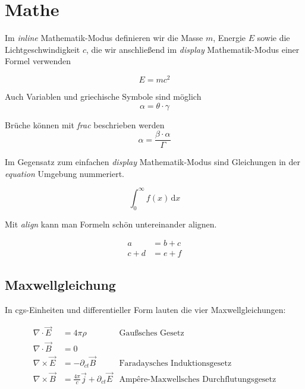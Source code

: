 \section{Mathe}

Im \textit{inline} Mathematik-Modus definieren wir die Masse $m$, Energie $E$ sowie die Lichtgeschwindigkeit \(c\), die wir anschließend im \textit{display} Mathematik-Modus einer Formel verwenden

\[
    E=mc^2
\]

Auch Variablen und griechische Symbole sind möglich
\[
    \alpha = \theta \cdot \gamma
\]

Brüche können mit \textit{frac} beschrieben werden
\[
    \alpha = \frac{\beta\cdot\alpha}{\Gamma}
\]

Im Gegensatz zum einfachen \textit{display} Mathematik-Modus sind Gleichungen in der \textit{equation} Umgebung nummeriert.

\begin{equation}
    \int_{0}^{\infty} f(x)\,\mathrm{d}x
\end{equation}

Mit \textit{align} kann man Formeln schön untereinander alignen.

\begin{align}
    a     & = b + c \\
    c + d & = e + f
\end{align}



\subsection{Maxwellgleichung}

In cgs-Einheiten und differentieller Form lauten die vier Maxwellgleichungen:

\begin{align}
    \nabla \cdot \vec{E}  & = 4\pi \rho                                     & \text{Gaußsches Gesetz}                        \\
    \nabla \cdot \vec{B}  & = 0                                             &                                                \\
    \nabla \times \vec{E} & = -\partial_{ct} \vec{B}                        & \text{Faradaysches Induktionsgesetz}           \\
    \nabla \times \vec{B} & = \frac{4\pi}{c}\vec{j} + \partial_{ct} \vec{E} & \text{Ampêre-Maxwellsches Durchflutungsgesetz}
\end{align}




\newpage
